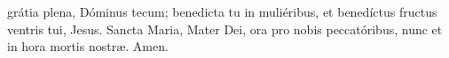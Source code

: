 grátia plena, Dóminus tecum; benedicta tu in muliéribus, et benedíctus fructus ventris tui,
Jesus. Sancta Maria, Mater Dei, ora pro nobis peccatóribus, nunc et in hora mortis nostr{\ae}. Amen.